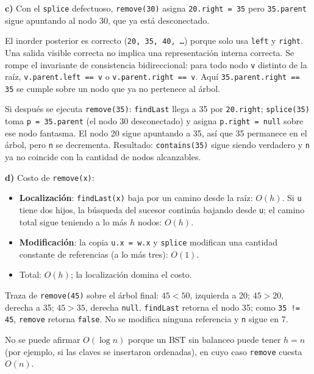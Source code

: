 \documentclass[11pt,a4paper]{article}
\begin{document}
\textbf{c)} Con el \texttt{splice} defectuoso, \texttt{remove(30)} asigna \texttt{20.right = 35} pero \texttt{35.parent} sigue apuntando al nodo 30, que ya está desconectado.

El inorder posterior es correcto (\texttt{20, 35, 40, \dots}) porque solo usa \texttt{left} y \texttt{right}. Una salida visible correcta no implica una representación interna correcta. Se rompe el invariante de consistencia bidireccional: para todo nodo \texttt{v} distinto de la raíz, \texttt{v.parent.left == v} o \texttt{v.parent.right == v}. Aquí \texttt{35.parent.right == 35} se cumple sobre un nodo que ya no pertenece al árbol.

Si después se ejecuta \texttt{remove(35)}: \texttt{findLast} llega a 35 por \texttt{20.right}; \texttt{splice(35)} toma \texttt{p = 35.parent} (el nodo 30 desconectado) y asigna \texttt{p.right = null} sobre ese nodo fantasma. El nodo 20 sigue apuntando a 35, así que 35 permanece en el árbol, pero \texttt{n} se decrementa. Resultado: \texttt{contains(35)} sigue siendo verdadero y \texttt{n} ya no coincide con la cantidad de nodos alcanzables.

\textbf{d)} Costo de \texttt{remove(x)}:
\begin{itemize}[itemsep=0pt]
\item \textbf{Localización}: \texttt{findLast(x)} baja por un camino desde la raíz: $O(h)$. Si \texttt{u} tiene dos hijos, la búsqueda del sucesor continúa bajando desde \texttt{u}; el camino total sigue teniendo a lo más $h$ nodos: $O(h)$.
\item \textbf{Modificación}: la copia \texttt{u.x = w.x} y \texttt{splice} modifican una cantidad constante de referencias (a lo más tres): $O(1)$.
\item Total: $O(h)$; la localización domina el costo.
\end{itemize}

Traza de \texttt{remove(45)} sobre el árbol final: $45 < 50$, izquierda a 20; $45 > 20$, derecha a 35; $45 > 35$, derecha \texttt{null}. \texttt{findLast} retorna el nodo 35; como \texttt{35 != 45}, \texttt{remove} retorna \texttt{false}. No se modifica ninguna referencia y \texttt{n} sigue en 7.

No se puede afirmar $O(\log n)$ porque un BST sin balanceo puede tener $h = n$ (por ejemplo, si las claves se insertaron ordenadas), en cuyo caso \texttt{remove} cuesta $O(n)$.
\end{document}

